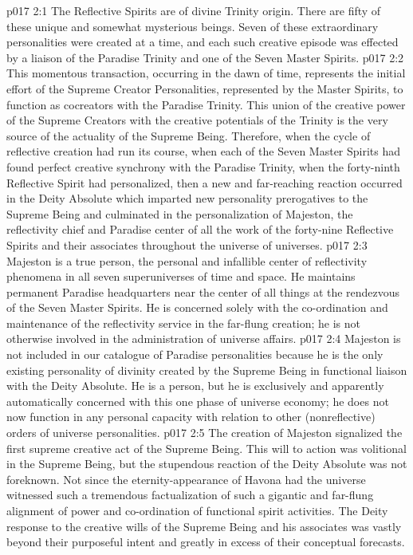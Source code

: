\vs p017 2:1 The Reflective Spirits are of divine Trinity origin. There are fifty of these unique and somewhat mysterious beings. Seven of these extraordinary personalities were created at a time, and each such creative episode was effected by a liaison of the Paradise Trinity and one of the Seven Master Spirits.
\vs p017 2:2 This momentous transaction, occurring in the dawn of time, represents the initial effort of the Supreme Creator Personalities, represented by the Master Spirits, to function as cocreators with the Paradise Trinity. This union of the creative power of the Supreme Creators with the creative potentials of the Trinity is the very source of the actuality of the Supreme Being. Therefore, when the cycle of reflective creation had run its course, when each of the Seven Master Spirits had found perfect creative synchrony with the Paradise Trinity, when the forty\hyp{}ninth Reflective Spirit had personalized, then a new and far\hyp{}reaching reaction occurred in the Deity Absolute which imparted new personality prerogatives to the Supreme Being and culminated in the personalization of Majeston, the reflectivity chief and Paradise center of all the work of the forty\hyp{}nine Reflective Spirits and their associates throughout the universe of universes.
\vs p017 2:3 Majeston is a true person, the personal and infallible center of reflectivity phenomena in all seven superuniverses of time and space. He maintains permanent Paradise headquarters near the center of all things at the rendezvous of the Seven Master Spirits. He is concerned solely with the co\hyp{}ordination and maintenance of the reflectivity service in the far\hyp{}flung creation; he is not otherwise involved in the administration of universe affairs.
\vs p017 2:4 Majeston is not included in our catalogue of Paradise personalities because he is the only existing personality of divinity created by the Supreme Being in functional liaison with the Deity Absolute. He is a person, but he is exclusively and apparently automatically concerned with this one phase of universe economy; he does not now function in any personal capacity with relation to other (nonreflective) orders of universe personalities.
\pc \vs p017 2:5 The creation of Majeston signalized the first supreme creative act of the Supreme Being. This will to action was volitional in the Supreme Being, but the stupendous reaction of the Deity Absolute was not foreknown. Not since the eternity\hyp{}appearance of Havona had the universe witnessed such a tremendous factualization of such a gigantic and far\hyp{}flung alignment of power and co\hyp{}ordination of functional spirit activities. The Deity response to the creative wills of the Supreme Being and his associates was vastly beyond their purposeful intent and greatly in excess of their conceptual forecasts.
